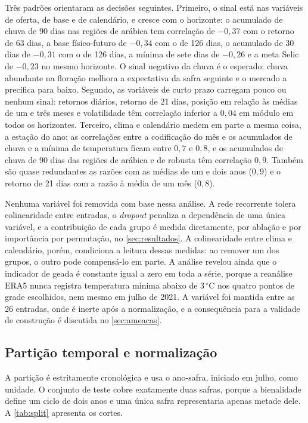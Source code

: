 Três padrões orientaram as decisões seguintes. Primeiro, o sinal está nas variáveis de oferta, de base e de calendário, e cresce com o horizonte: o acumulado de chuva de 90 dias nas regiões de arábica tem correlação de $-0{,}37$ com o retorno de 63 dias, a base físico-futuro de $-0{,}34$ com o de 126 dias, o acumulado de 30 dias de $-0{,}31$ com o de 126 dias, a mínima de sete dias de $-0{,}26$ e a meta Selic de $-0{,}23$ no mesmo horizonte. O sinal negativo da chuva é o esperado: chuva abundante na floração melhora a expectativa da safra seguinte e o mercado a precifica para baixo. Segundo, as variáveis de curto prazo carregam pouco ou nenhum sinal: retornos diários, retorno de 21 dias, posição em relação às médias de um e três meses e volatilidade têm correlação inferior a $0{,}04$ em módulo em todos os horizontes. Terceiro, clima e calendário medem em parte a mesma coisa, a estação do ano: as correlações entre a codificação do mês e os acumulados de chuva e a mínima de temperatura ficam entre $0{,}7$ e $0{,}8$, e os acumulados de chuva de 90 dias das regiões de arábica e de robusta têm correlação $0{,}9$. Também são quase redundantes as razões com as médias de um e dois anos ($0{,}9$) e o retorno de 21 dias com a razão à média de um mês ($0{,}8$).

Nenhuma variável foi removida com base nessa análise. A rede recorrente tolera colinearidade entre entradas, o \textit{dropout} penaliza a dependência de uma única variável, e a contribuição de cada grupo é medida diretamente, por ablação e por importância por permutação, no \autoref{sec:resultados}. A colinearidade entre clima e calendário, porém, condiciona a leitura dessas medidas: ao remover um dos grupos, o outro pode compensá-lo em parte. A análise revelou ainda que o indicador de geada é constante igual a zero em toda a série, porque a reanálise ERA5 nunca registra temperatura mínima abaixo de 3\,$^{\circ}$C nos quatro pontos de grade escolhidos, nem mesmo em julho de 2021. A variável foi mantida entre as 26 entradas, onde é inerte após a normalização, e a consequência para a validade de construção é discutida no \autoref{sec:ameacas}.

\subsection{Partição temporal e normalização}

A partição é estritamente cronológica e usa o ano-safra, iniciado em julho, como unidade. O conjunto de teste cobre exatamente duas safras, porque a bienalidade define um ciclo de dois anos e uma única safra representaria apenas metade dele. A \autoref{tab:split} apresenta os cortes.


